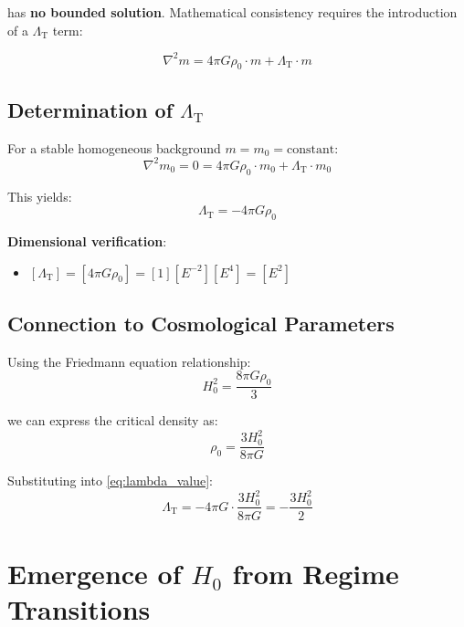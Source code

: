\documentclass[12pt,a4paper]{article}
\newcommand{\LambdaT}{\Lambda_{\text{T}}}
\newcommand{\Hzero}{H_0}
\begin{document}
	has \textbf{no bounded solution}. Mathematical consistency requires the introduction of a $\LambdaT$ term:
	
	\begin{equation}
		\boxed{\nabla^2 m = 4\pi G \rho_0 \cdot m + \LambdaT \cdot m}
		\label{eq:modified_field_equation}
	\end{equation}
	
	\subsection{Determination of $\LambdaT$}
	\label{subsec:lambda_determination}
	
	For a stable homogeneous background $m = m_0 = \text{constant}$:
	\begin{equation}
		\nabla^2 m_0 = 0 = 4\pi G \rho_0 \cdot m_0 + \LambdaT \cdot m_0
	\end{equation}
	
	This yields:
	\begin{equation}
		\boxed{\LambdaT = -4\pi G \rho_0}
		\label{eq:lambda_value}
	\end{equation}
	
	\textbf{Dimensional verification}:
	\begin{itemize}
		\item $[\LambdaT] = [4\pi G \rho_0] = [1][E^{-2}][E^4] = [E^2]$ \checkmark
	\end{itemize}
	
	\subsection{Connection to Cosmological Parameters}
	\label{subsec:cosmological_connection}
	
	Using the Friedmann equation relationship:
	\begin{equation}
		\Hzero^2 = \frac{8\pi G \rho_0}{3}
	\end{equation}
	
	we can express the critical density as:
	\begin{equation}
		\rho_0 = \frac{3\Hzero^2}{8\pi G}
	\end{equation}
	
	Substituting into \cref{eq:lambda_value}:
	\begin{equation}
		\LambdaT = -4\pi G \cdot \frac{3\Hzero^2}{8\pi G} = -\frac{3\Hzero^2}{2}
		\label{eq:lambda_hubble_relation}
	\end{equation}
	
	\section{Emergence of $H_0$ from Regime Transitions}
	\label{sec:h0_emergence}
	
\end{document}
